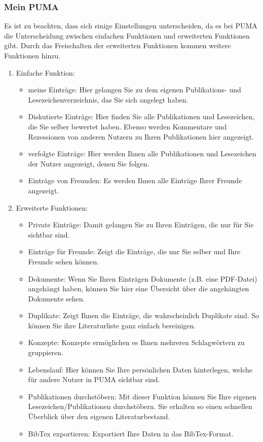 \subsubsection{Mein PUMA}
Es ist zu beachten, dass sich einige Einstellungen unterscheiden, da es bei PUMA die Unterscheidung zwischen einfachen Funktionen und erweiterten Funktionen gibt. Durch das Freischalten der erweiterten Funktionen kommen weitere Funktionen hinzu.
\begin{enumerate}
    \item Einfache Funktion:
    \begin{itemize}
        \item meine Einträge: Hier gelangen Sie zu dem eigenen Publikations- und Lesezeichenverzeichnis, das Sie sich angelegt haben.
        \item Diskutierte Einträge: Hier finden Sie alle Publikationen und Lesezeichen, die Sie selber bewertet haben. Ebenso werden Kommentare und Rezessionen von anderen Nutzern zu Ihren Publikationen hier angezeigt.
        \item verfolgte Einträge: Hier werden Ihnen alle Publikationen und Lesezeichen der Nutzer angezeigt, denen Sie folgen.
        \item Einträge von Freunden: Es werden Ihnen alle Einträge Ihrer Freunde angezeigt.
    \end{itemize}
    \item Erweiterte Funktionen:
    \begin{itemize}
        \item Private Einträge: Damit gelangen Sie zu Ihren Einträgen, die nur für Sie sichtbar sind. 
        \item Einträge für Freunde: Zeigt die Einträge, die nur Sie selber und Ihre Freunde sehen können.
        \item Dokumente: Wenn Sie Ihren Einträgen Dokumente (z.B. eine PDF-Datei) angehängt haben, können Sie hier eine Übersicht über die angehängten Dokumente sehen.
        \item Duplikate: Zeigt Ihnen die Einträge, die wahrscheinlich Duplikate sind. So können Sie ihre Literaturliste ganz einfach bereinigen. 
        \item Konzepte: Konzepte ermöglichen es Ihnen mehreren Schlagwörtern zu gruppieren. 
        \item Lebenslauf: Hier können Sie Ihre persönlichen Daten hinterlegen, welche für andere Nutzer in PUMA sichtbar sind.
        \item Publikationen durchstöbern: Mit dieser Funktion können Sie Ihre eigenen Lesezeichen/Publikationen durchstöbern. Sie erhalten so einen schnellen Überblick über den eigenen Literaturbestand. 
        \item BibTex exportieren: Exportiert Ihre Daten in das BibTex-Format.
    \end{itemize}
\end{enumerate}

